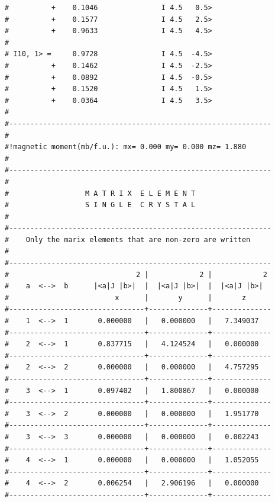 \begin{enumerate}
{\begin{verbatim}
#          +    0.1046               I 4.5   0.5>              
#          +    0.1577               I 4.5   2.5>              
#          +    0.9633               I 4.5   4.5>              
#                                                              
# I10, 1> =     0.9728               I 4.5  -4.5>              
#          +    0.1462               I 4.5  -2.5>              
#          +    0.0892               I 4.5  -0.5>              
#          +    0.1520               I 4.5   1.5>              
#          +    0.0364               I 4.5   3.5>              
#                                                              
#-------------------------------------------------------------- 
#
#!magnetic moment(mb/f.u.): mx= 0.000 my= 0.000 mz= 1.880
#
#-------------------------------------------------------------- 
#                                                              
#                  M A T R I X  E L E M E N T                  
#                  S I N G L E  C R Y S T A L                    
#                                                              
#--------------------------------------------------------------
#    Only the marix elements that are non-zero are written     
#                                                              
#--------------------------------------------------------------
#                              2 |            2 |            2 
#    a  <-->  b      |<a|J |b>|  |  |<a|J |b>|  |  |<a|J |b>|  
#                         x      |       y      |       z      
#--------------------------------+--------------+--------------
#    1  <-->  1       0.000000   |   0.000000   |   7.349037   
#--------------------------------+--------------+--------------
#    2  <-->  1       0.837715   |   4.124524   |   0.000000   
#--------------------------------+--------------+--------------
#    2  <-->  2       0.000000   |   0.000000   |   4.757295   
#--------------------------------+--------------+--------------
#    3  <-->  1       0.097402   |   1.800867   |   0.000000   
#--------------------------------+--------------+--------------
#    3  <-->  2       0.000000   |   0.000000   |   1.951770   
#--------------------------------+--------------+--------------
#    3  <-->  3       0.000000   |   0.000000   |   0.002243   
#--------------------------------+--------------+--------------
#    4  <-->  1       0.000000   |   0.000000   |   1.052055   
#--------------------------------+--------------+--------------
#    4  <-->  2       0.006254   |   2.906196   |   0.000000   
#--------------------------------+--------------+--------------

\end{verbatim}}
\end{enumerate}
